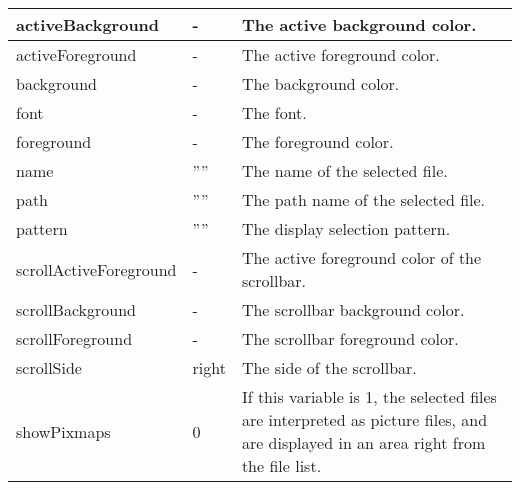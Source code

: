 {\newpage
\clearpage
\samepage \begin{supertabular}{|l|l|p{5.5cm}|}
activeBackground       & -       & The active background
                                   color. \\  \hline
activeForeground       & -       & The active foreground
                                   color. \\  \hline
background             & -       & The background color. \\  \hline
font                   & -       & The font. \\  \hline
foreground             & -       & The foreground color. \\  \hline
name                   & ''''    & The name of the selected
                                   file. \\  \hline
path                   & ''''    & The path name of the
                                   selected file. \\  \hline
pattern                & ''''    & The display selection
                                   pattern. \\  \hline
scrollActiveForeground & -       & The active foreground
                                   color of the scrollbar.\\  \hline 
scrollBackground       & -       & The scrollbar background
                                   color. \\  \hline
scrollForeground       & -       & The scrollbar foreground
                                   color. \\  \hline
scrollSide             & right   & The side of the
                                   scrollbar. \\  \hline 
showPixmaps            & 0       & If this variable is 1,
                                   the selected files are
                                   interpreted as picture
                                   files, and are displayed
                                   in an area right from the
                                   file list. \\  \hline
\end{supertabular}
}

{\newpage
\clearpage
\samepage \begin{figure}[ht]
  \centerline{
  \epsfysize=8cm
  }
  
  \label{fig:FSBox}
\end{figure}
}

